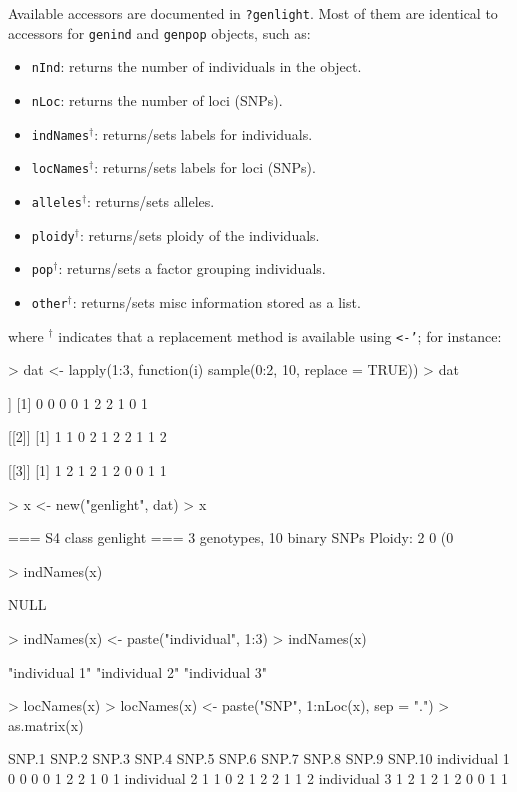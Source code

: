 \documentclass{article}
\newcommand{\code}[1]{{{\tt #1}}}
\begin{document}
Available accessors are documented in \code{?genlight}.
Most of them are identical to accessors for \texttt{genind} and \texttt{genpop} objects, such as:
\begin{itemize}
  \item \texttt{nInd}: returns the number of individuals in the object.
  \item \texttt{nLoc}: returns the number of loci (SNPs).
  \item \texttt{indNames}$^{\dagger}$: returns/sets labels for individuals.
  \item \texttt{locNames}$^{\dagger}$: returns/sets labels for loci (SNPs).
  \item \texttt{alleles}$^{\dagger}$: returns/sets alleles.
  \item \texttt{ploidy}$^{\dagger}$: returns/sets ploidy of the individuals.
  \item \texttt{pop}$^{\dagger}$: returns/sets a factor grouping individuals.
  \item \texttt{other}$^{\dagger}$: returns/sets misc information stored as a list.
\end{itemize}
where $^{\dagger}$ indicates that a replacement method is available using \texttt{<-'}; for instance:
\begin{Schunk}
\begin{Sinput}
> dat <- lapply(1:3, function(i) sample(0:2, 10, replace = TRUE))
> dat
\end{Sinput}
\begin{Soutput}
[[1]]
 [1] 0 0 0 0 1 2 2 1 0 1

[[2]]
 [1] 1 1 0 2 1 2 2 1 1 2

[[3]]
 [1] 1 2 1 2 1 2 0 0 1 1
\end{Soutput}
\begin{Sinput}
> x <- new("genlight", dat)
> x
\end{Sinput}
\begin{Soutput}
 === S4 class genlight ===
 3 genotypes,  10 binary SNPs
 Ploidy: 2
 0 (0 %
\end{Soutput}
\begin{Sinput}
> indNames(x)
\end{Sinput}
\begin{Soutput}
NULL
\end{Soutput}
\begin{Sinput}
> indNames(x) <- paste("individual", 1:3)
> indNames(x)
\end{Sinput}
\begin{Soutput}
[1] "individual 1" "individual 2" "individual 3"
\end{Soutput}
\begin{Sinput}
> locNames(x)
> locNames(x) <- paste("SNP", 1:nLoc(x), sep = ".")
> as.matrix(x)
\end{Sinput}
\begin{Soutput}
             SNP.1 SNP.2 SNP.3 SNP.4 SNP.5 SNP.6 SNP.7 SNP.8 SNP.9 SNP.10
individual 1     0     0     0     0     1     2     2     1     0      1
individual 2     1     1     0     2     1     2     2     1     1      2
individual 3     1     2     1     2     1     2     0     0     1      1
\end{Soutput}
\end{Schunk}
\end{document}
